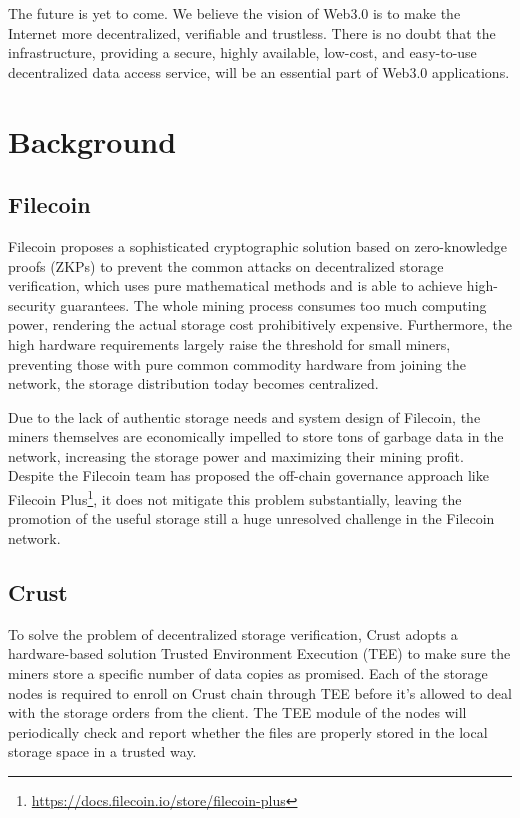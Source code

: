 \documentclass[]{article}
\begin{document}
The future is yet to come. We believe the vision of Web3.0 is to make the Internet more decentralized, verifiable and trustless. There is no doubt that the infrastructure, providing a secure, highly available, low-cost, and easy-to-use decentralized data access service, will be an essential part of Web3.0 applications.

\section{Background}

\subsection{Filecoin}

Filecoin\cite{ref1} proposes a sophisticated cryptographic solution based on zero-knowledge proofs (ZKPs) to prevent the common attacks on decentralized storage verification, which uses pure mathematical methods and is able to achieve high-security guarantees. The whole mining process consumes too much computing power, rendering the actual storage cost prohibitively expensive. Furthermore, the high hardware requirements largely raise the threshold for small miners, preventing those with pure common commodity hardware from joining the network, the storage distribution today becomes centralized.

Due to the lack of authentic storage needs and system design of Filecoin, the miners themselves are economically impelled to store tons of garbage data in the network, increasing the storage power and maximizing their mining profit. Despite the Filecoin team has proposed the off-chain governance approach like Filecoin Plus\footnote{\url{https://docs.filecoin.io/store/filecoin-plus}}, it does not mitigate this problem substantially, leaving the promotion of the useful storage still a huge unresolved challenge in the Filecoin network.

\subsection{Crust}

To solve the problem of decentralized storage verification, Crust\cite{ref2} adopts a hardware-based solution Trusted Environment Execution (TEE) to make sure the miners store a specific number of data copies as promised. Each of the storage nodes is required to enroll on Crust chain through TEE before it's allowed to deal with the storage orders from the client. The TEE module of the nodes will periodically check and report whether the files are properly stored in the local storage space in a trusted way.
\end{document}

